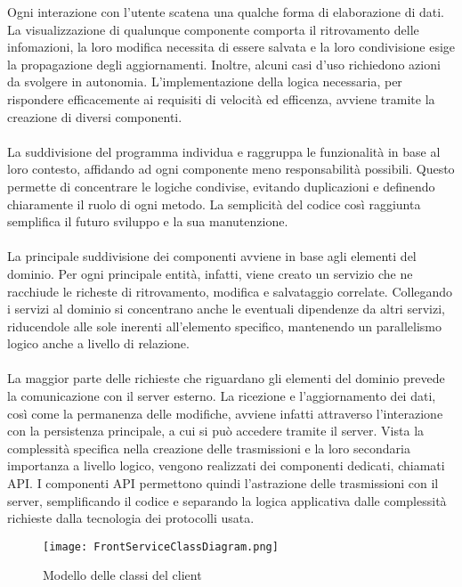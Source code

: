 Ogni interazione con l'utente scatena una qualche forma di elaborazione di dati. 
La visualizzazione di qualunque componente comporta il ritrovamento delle infomazioni, 
la loro modifica necessita di essere salvata e la loro condivisione esige la propagazione degli aggiornamenti.
Inoltre, alcuni casi d'uso richiedono azioni da svolgere in autonomia.
L'implementazione della logica necessaria, 
per rispondere efficacemente ai requisiti di velocità ed efficenza,
avviene tramite la creazione di diversi componenti.\\
\\
La suddivisione del programma individua e raggruppa le funzionalità in base al loro contesto, 
affidando ad ogni componente meno responsabilità possibili.
Questo permette di concentrare le logiche condivise, 
evitando duplicazioni e definendo chiaramente il ruolo di ogni metodo.
La semplicità del codice così raggiunta semplifica il futuro sviluppo e la sua manutenzione.\\
\\
La principale suddivisione dei componenti avviene in base agli elementi del dominio.
Per ogni principale entità, infatti, viene creato un servizio che ne racchiude
le richeste di ritrovamento, modifica e salvataggio correlate.
Collegando i servizi al dominio si concentrano anche le eventuali dipendenze da altri servizi, 
riducendole alle sole inerenti all'elemento specifico, 
mantenendo un parallelismo logico anche a livello di relazione.\\
\\
La maggior parte delle richieste che riguardano gli elementi del dominio prevede 
la comunicazione con il server esterno. 
La ricezione e l'aggiornamento dei dati, così come la permanenza delle modifiche, avviene infatti attraverso 
l'interazione con la persistenza principale, a cui si può accedere tramite il server.
Vista la complessità specifica nella creazione delle trasmissioni e 
la loro secondaria importanza a livello logico, 
vengono realizzati dei componenti dedicati, chiamati API.
I componenti API permettono quindi l'astrazione delle trasmissioni con il server, 
semplificando il codice e 
separando la logica applicativa dalle complessità richieste dalla tecnologia dei protocolli usata.

\clearpage 

\begin{figure}[h!]
    \begin{center}
        \texttt{[image: FrontServiceClassDiagram.png]}
        \caption{Modello delle classi del client}
    \end{center}
\end{figure}

